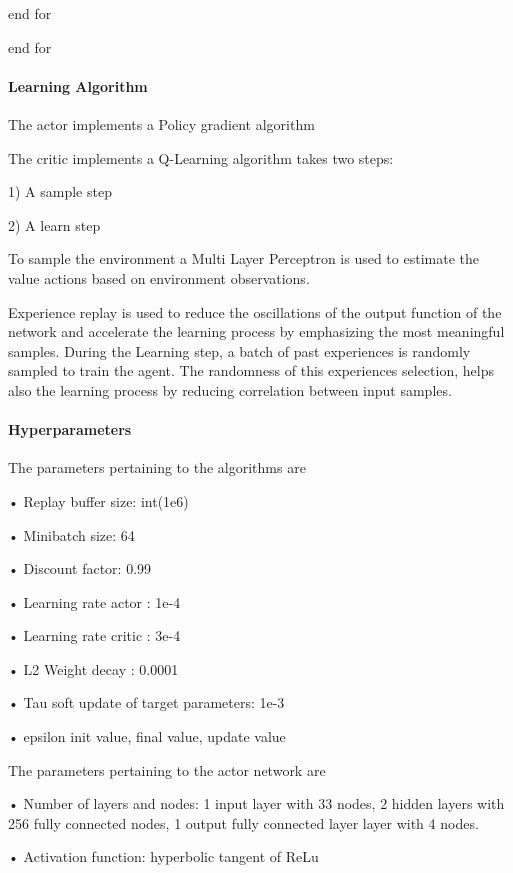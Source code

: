 \documentclass[11pt]{amsart}
\begin{document}
\-\hspace{5mm}end for 

end for 
 

\paragraph{\textbf{Learning Algorithm}}

The actor implements a Policy gradient algorithm

The critic implements a Q-Learning algorithm takes two steps:

1)	A sample step

2)	A learn step


To sample the environment a Multi Layer Perceptron is used to estimate the value actions based on environment observations.

Experience replay is used to reduce the oscillations of the output function of the network and accelerate the learning process by emphasizing the most meaningful samples. 
During the Learning step, a batch of past experiences is randomly sampled to train the agent.
The randomness of this experiences selection, helps also the learning process by reducing correlation between input samples. 

\paragraph{\textbf{Hyperparameters}}

The parameters pertaining to the algorithms are

•	Replay buffer size: int(1e6)

•	Minibatch size: 64 

•	Discount factor: 0.99  

•	Learning rate actor : 1e-4

•	Learning rate critic : 3e-4

•	L2 Weight decay : 0.0001

•	Tau soft update of target parameters: 1e-3



•	epsilon init value, final value, update value

The parameters pertaining to the actor network are

• Number of layers and nodes: 1 input layer with 33 nodes, 2 hidden layers with 256 fully connected nodes, 1 output fully connected layer layer with 4 nodes.

• Activation function: hyperbolic tangent of ReLu
\end{document}
